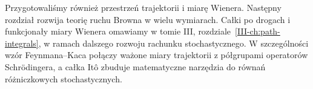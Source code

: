 Przygotowaliśmy również przestrzeń trajektorii i miarę Wienera.
Następny rozdział rozwija teorię ruchu Browna w wielu
wymiarach. Całki po drogach i funkcjonały miary Wienera
omawiamy w tomie III, rozdziale~\ref{III-ch:path-integrals},
w ramach dalszego rozwoju rachunku stochastycznego.
W szczególności wzór Feynmana--Kaca połączy
ważone miary trajektorii z półgrupami operatorów
Schrödingera, a całka Itô zbuduje matematyczne
narzędzia do równań różniczkowych stochastycznych.


